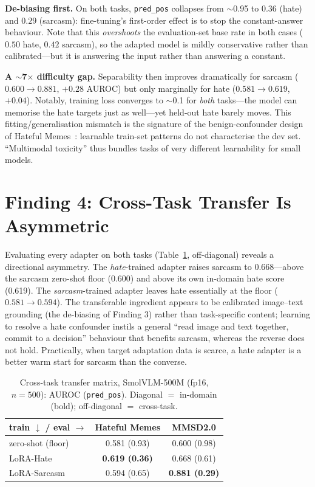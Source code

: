 \documentclass[sigconf,nonacm]{acmart}
\begin{document}
\noindent\textbf{De-biasing first.} On both tasks, \texttt{pred\_pos} collapses from
$\sim$0.95 to $0.36$ (hate) and $0.29$ (sarcasm): fine-tuning's first-order effect is to stop
the constant-answer behaviour. Note that this \emph{overshoots} the evaluation-set base rate
in both cases ($0.50$ hate, $0.42$ sarcasm), so the adapted model is mildly conservative
rather than calibrated---but it is answering the input rather than answering a constant.

\noindent\textbf{A $\sim$7$\times$ difficulty gap.} Separability then improves
dramatically for sarcasm ($0.600\to0.881$, $+0.28$ AUROC) but only marginally for hate
($0.581\to0.619$, $+0.04$). Notably, training loss converges to $\sim$0.1 for \emph{both}
tasks---the model can memorise the hate targets just as well---yet held-out hate barely
moves. This fitting/generalisation mismatch is the signature of the benign-confounder
design of Hateful Memes~\cite{kiela2020hateful}: learnable train-set patterns do not
characterise the dev set. ``Multimodal toxicity'' thus bundles tasks of very different
learnability for small models.

\section{Finding 4: Cross-Task Transfer Is Asymmetric}\label{sec:transfer}
Evaluating every adapter on both tasks (Table~\ref{tab:matrix}, off-diagonal) reveals a
directional asymmetry. The \emph{hate}-trained adapter raises sarcasm to 0.668---above the
sarcasm zero-shot floor (0.600) and above its own in-domain hate score (0.619). The
\emph{sarcasm}-trained adapter leaves hate essentially at the floor ($0.581\to0.594$). The
transferable ingredient appears to be calibrated image--text grounding (the de-biasing of
Finding 3) rather than task-specific content; learning to resolve a hate confounder
instils a general ``read image and text together, commit to a decision'' behaviour that
benefits sarcasm, whereas the reverse does not hold. Practically, when target adaptation
data is scarce, a hate adapter is a better warm start for sarcasm than the converse.

\begin{table}[t]
\centering
\caption{Cross-task transfer matrix, SmolVLM-500M (fp16, $n{=}500$): AUROC
(\texttt{pred\_pos}). Diagonal $=$ in-domain (bold); off-diagonal $=$ cross-task.}
\label{tab:matrix}
\begin{tabular}{lcc}
\toprule
\textbf{train} $\downarrow$ / \textbf{eval} $\rightarrow$ & Hateful Memes & MMSD2.0 \\
\midrule
zero-shot (floor) & 0.581 (0.93) & 0.600 (0.98) \\
LoRA-Hate         & \textbf{0.619 (0.36)} & 0.668 (0.61) \\
LoRA-Sarcasm      & 0.594 (0.65) & \textbf{0.881 (0.29)} \\
\bottomrule
\end{tabular}
\end{table}
\end{document}
